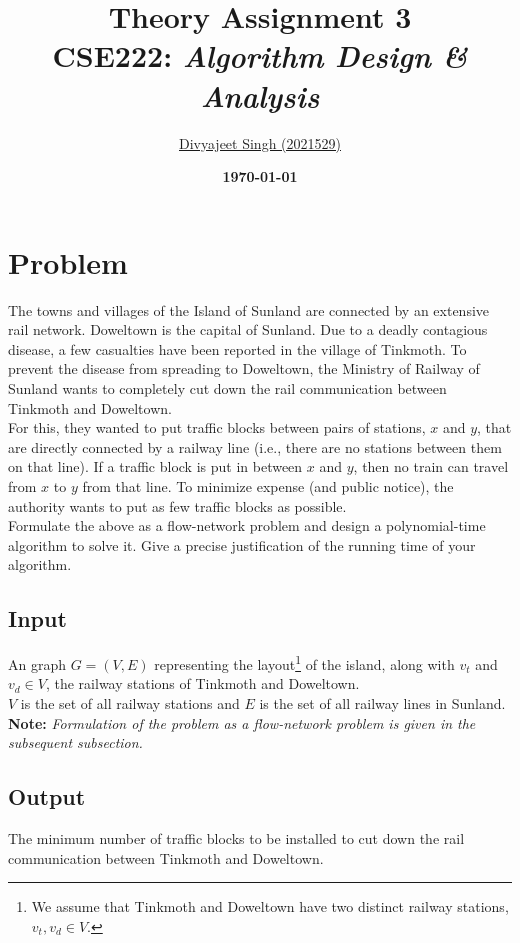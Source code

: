 \documentclass[12pt]{report}
\title{
    \textbf{\Huge{Theory Assignment 3}} \\
    \vspace*{15pt}
    \large{CSE222: \textit{Algorithm Design \& Analysis}}
}
\author{
    \href{mailto:divyajeet21529@iiitd.ac.in}{Divyajeet Singh (2021529)}
}
\date{
    \vspace*{10pt}
    \textbf{\today}
}
\begin{document}
    \maketitle

    \section*{\huge{Problem}}
    The towns and villages of the Island of Sunland are connected by an extensive rail network.
    Doweltown is the capital of Sunland. Due to a deadly contagious disease,
    a few casualties have been reported in the village of Tinkmoth. To prevent the disease from
    spreading to Doweltown, the Ministry of Railway of Sunland wants to completely
    cut down the rail communication between Tinkmoth and Doweltown. \\
    For this, they wanted to put traffic blocks between pairs of stations, $x$ and $y$, that are
    directly connected by a railway line (i.e., there are no stations between them on that line).
    If a traffic block is put in between $x$ and $y$, then no train can travel from $x$ to $y$ from that
    line. To minimize expense (and public notice), the authority wants to put as few traffic blocks
    as possible. \\
    Formulate the above as a flow-network problem and design a polynomial-time algorithm to
    solve it. Give a precise justification of the running time of your algorithm.

    \subsection*{Input}
    An graph $G = (V, E)$ representing the layout\footnote{
        We assume that Tinkmoth and Doweltown have two distinct railway stations, $v_{t}, v_{d} \in V$.
    } of the island, along with $v_{t}$ and $v_{d} \in V$, the railway stations of Tinkmoth and Doweltown. \\
    $V$ is the set of all railway stations and $E$ is the set of all railway lines in Sunland.
    \vspace*{7.5pt} \\
    \textbf{Note:} \textit{Formulation of the problem as a flow-network problem is given in the subsequent subsection.}

    \subsection*{Output}
    The minimum number of traffic blocks to be installed to cut down the rail communication between Tinkmoth and Doweltown.
\end{document}
